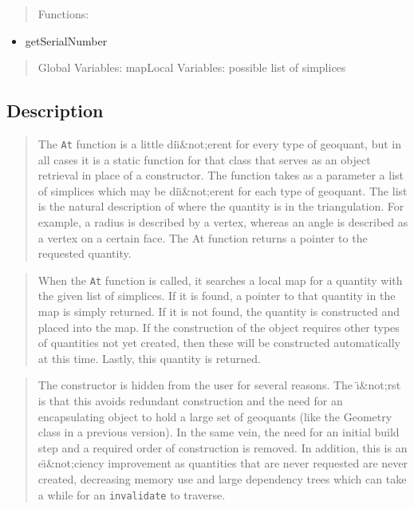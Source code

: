 \documentclass[10pt]{article}%
\begin{document}
\begin{quotation} Functions: \end{quotation}
\begin{itemize}
\item  getSerialNumber
\end{itemize}
\begin{quotation} Global Variables: mapLocal Variables: possible list of simplices\end{quotation}

\subsection*{Description}

\begin{quotation} The \texttt{At} function is a little di\"{\i}\&not;erent for every type of geoquant, but in all cases it is a static function for that class that serves as an object retrieval in place of a constructor. The function takes as a parameter a list of simplices which may be di\"{\i}\&not;erent for each type of geoquant. The list is the natural description of where the quantity is in the triangulation. For example, a radius is described by a vertex, whereas an angle is described as a vertex on a certain face. The At function returns a pointer to the requested quantity.\end{quotation}
\begin{quotation} When the \texttt{At} function is called, it searches a local map for a quantity with the given list of simplices.  If it is found, a pointer to that quantity in the map is simply returned.  If it is not found, the quantity is constructed and placed into the map.  If the construction of the object requires other types of quantities not yet created, then these will be constructed automatically at this time. Lastly, this quantity is returned.\end{quotation}
\begin{quotation} The constructor is hidden from the user for several reasons. The \"{\i}\&not;rst is that this avoids redundant construction and the need for an encapsulating object to hold a large set of geoquants (like the Geometry class in a previous version).  In the same vein, the need for an initial build step and a required order of construction is removed. In addition, this is an e\"{\i}\&not;ciency improvement as quantities that are never requested are never created, decreasing memory use and large dependency trees which can take a while for an \texttt{invalidate} to traverse.\end{quotation}
\end{document}
